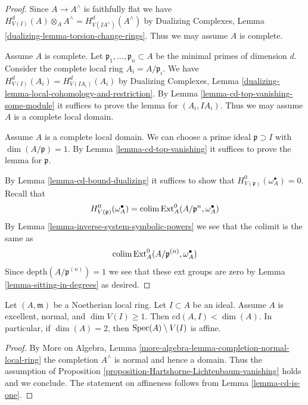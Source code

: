 \begin{proof}
Since $A \to A^\wedge$ is faithfully flat we have
$H^d_{V(I)}(A) \otimes_A A^\wedge = H^d_{V(IA^\wedge)}(A^\wedge)$
by Dualizing Complexes, Lemma \ref{dualizing-lemma-torsion-change-rings}.
Thus we may assume $A$ is complete.

\medskip\noindent
Assume $A$ is complete. Let $\mathfrak p_1, \ldots, \mathfrak p_n \subset A$
be the minimal primes of dimension $d$. Consider the complete local ring
$A_i = A/\mathfrak p_i$. We have $H^d_{V(I)}(A_i) = H^d_{V(IA_i)}(A_i)$
by Dualizing Complexes, Lemma
\ref{dualizing-lemma-local-cohomology-and-restriction}.
By Lemma \ref{lemma-cd-top-vanishing-some-module}
it suffices to prove the lemma for $(A_i, IA_i)$.
Thus we may assume $A$ is a complete local domain.

\medskip\noindent
Assume $A$ is a complete local domain. We can choose a prime ideal
$\mathfrak p \supset I$ with $\dim(A/\mathfrak p) = 1$.
By Lemma \ref{lemma-cd-top-vanishing}
it suffices to prove the lemma for $\mathfrak p$.

\medskip\noindent
By Lemma \ref{lemma-cd-bound-dualizing} it suffices to show that
$H^0_{V(\mathfrak p)}(\omega_A^\bullet) = 0$.
Recall that
$$
H^0_{V(\mathfrak p)}(\omega_A^\bullet) =
\mathop{\mathrm{colim}}\nolimits \text{Ext}^0_A(A/\mathfrak p^n, \omega_A^\bullet)
$$
By Lemma \ref{lemma-inverse-system-symbolic-powers}
we see that the colimit is the same as
$$
\mathop{\mathrm{colim}}\nolimits \text{Ext}^0_A(A/\mathfrak p^{(n)}, \omega_A^\bullet)
$$
Since $\text{depth}(A/\mathfrak p^{(n)}) = 1$ we see that
these ext groups are zero by Lemma \ref{lemma-sitting-in-degrees}
as desired.
\end{proof}

\begin{lemma}
\label{lemma-affine-complement}
Let $(A, \mathfrak m)$ be a Noetherian local ring.
Let $I \subset A$ be an ideal. Assume $A$ is excellent,
normal, and $\dim V(I) \geq 1$. Then $\text{cd}(A, I) < \dim(A)$.
In particular, if $\dim(A) = 2$, then $\mathop{\mathrm{Spec}}(A) \setminus V(I)$ is affine.
\end{lemma}

\begin{proof}
By More on Algebra, Lemma
\ref{more-algebra-lemma-completion-normal-local-ring}
the completion $A^\wedge$ is normal and hence a domain.
Thus the assumption of
Proposition \ref{proposition-Hartshorne-Lichtenbaum-vanishing}
holds and we conclude. The statement on affineness
follows from Lemma \ref{lemma-cd-is-one}.
\end{proof}
















